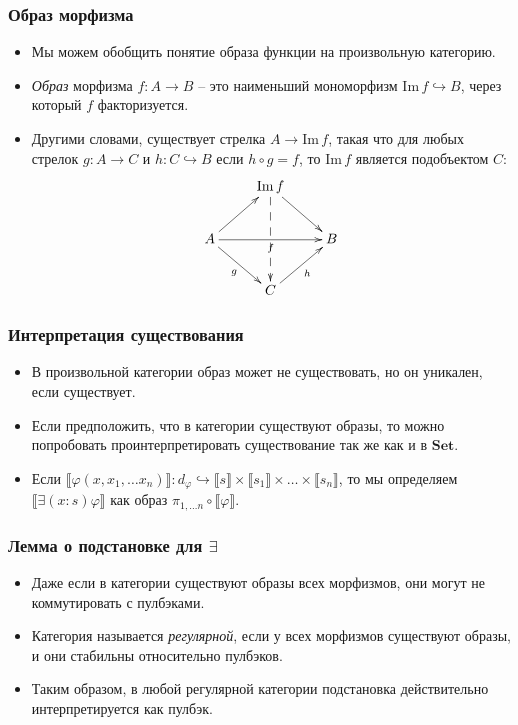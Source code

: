 \documentclass{beamer}
\theoremstyle{definition}
\newcommand{\cat}[1]{\mathbf{#1}}
\newcommand{\Set}{\cat{Set}}
\renewcommand{\ll}{\llbracket}
\newcommand{\rr}{\rrbracket}
\newcommand{\fs}[1]{\mathrm{#1}}
\newcommand{\im}{\fs{Im}}
\begin{document}
\begin{frame}
\frametitle{Образ морфизма}
\begin{itemize}
\item Мы можем обобщить понятие образа функции на произвольную категорию.
\item \emph{Образ} морфизма $f : A \to B$ -- это наименьший мономорфизм $\im\,f \hookrightarrow B$, через который $f$ факторизуется.
\item Другими словами, существует стрелка $A \to \im\,f$, такая что для любых стрелок $g : A \to C$ и $h : C \hookrightarrow B$ если $h \circ g = f$,
то $\im\,f$ является подобъектом $C$:
\[ \xymatrix{                               & \im\,f \ar[dr] \ar@{-->}[dd] &   \\
              A \ar[ur] \ar[dr]_g \ar[rr]_f &                              & B \\
                                            & C \ar[ur]_h
            } \]
\end{itemize}
\end{frame}

\begin{frame}
\frametitle{Интерпретация существования}
\begin{itemize}
\item В произвольной категории образ может не существовать, но он уникален, если существует.
\item Если предположить, что в категории существуют образы, то можно попробовать проинтерпретировать существование так же как и в $\Set$.
\item Если $\ll \varphi(x, x_1, \ldots x_n) \rr : d_\varphi \hookrightarrow \ll s \rr \times \ll s_1 \rr \times \ldots \times \ll s_n \rr$,
то мы определяем $\ll \exists (x : s) \varphi \rr$ как образ $\pi_{1, \ldots n} \circ \ll \varphi \rr$.
\end{itemize}
\end{frame}

\begin{frame}
\frametitle{Лемма о подстановке для $\exists$}
\begin{itemize}
\item Даже если в категории существуют образы всех морфизмов, они могут не коммутировать с пулбэками.
\item Категория называется \emph{регулярной}, если у всех морфизмов существуют образы, и они стабильны относительно пулбэков.
\item Таким образом, в любой регулярной категории подстановка действительно интерпретируется как пулбэк.
\end{itemize}
\end{frame}
\end{document}
